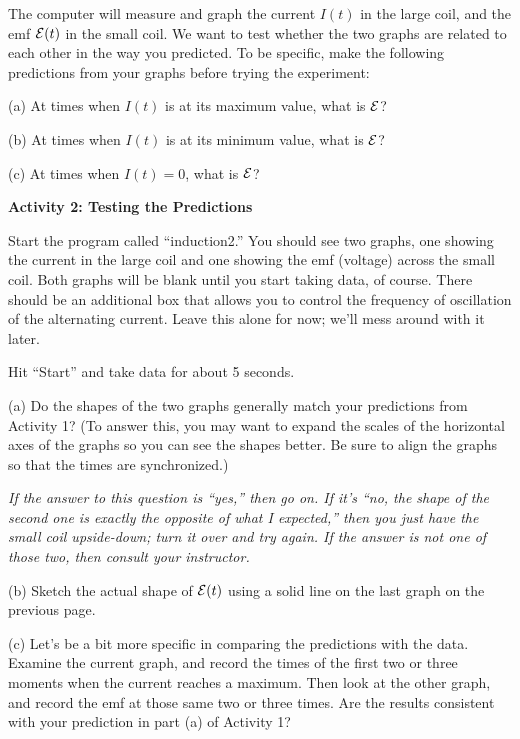 The computer will measure and graph
the current $I(t)$ in the large coil, and the emf ${\cal E}(t)$
in the small coil.  We want to test whether the two graphs are related
to each other in the way you predicted.  To be specific, make the following
predictions from your graphs before trying the experiment:

(a) At times when $I(t)$ is at its maximum value, what is ${\cal E}$?
\answerspace{.8in}

(b) At times when $I(t)$ is at its minimum value, what is ${\cal E}$?
\answerspace{.8in}

(c) At times when $I(t)=0$, what is ${\cal E}$?
\answerspace{.8in}


\pagebreak[2]

{\bf Activity 2: Testing the Predictions}

Start the program called ``induction2.'' You should see two graphs,
one showing the current in the large coil and one showing the emf (voltage)
across the small coil.  Both graphs will be blank until you start taking
data, of course.  There should be an additional box that allows you to control
the frequency of oscillation of the alternating current.  Leave this alone
for now; we'll mess around with it later.

Hit ``Start'' and take data for about 5 seconds.  

(a) Do the shapes of the
two graphs generally match your predictions from Activity 1? (To answer this, you may want to expand the scales of the horizontal axes of the graphs so you can see the shapes better.  Be sure to align the graphs so that the times are synchronized.) 

\answerspace{1in}

\textit{If the answer to this question is ``yes,'' then go on.  If it's ``no,
the shape of the second one is exactly the opposite of what I expected,''
then you just have the small coil upside-down; turn it over and 
try again.  If the answer is not one of those two, then consult your 
instructor.}

(b) Sketch the actual shape of ${\cal E}(t)$ using a solid line on the last graph on the previous page.
\bigskip

(c) Let's be a bit more specific in comparing the predictions
with the data.  Examine the current graph, and record the
times of the first two or three moments when the current reaches a maximum.
Then look at the other graph, and record the emf at those same two or three times.
Are the results consistent with your prediction in part (a) of Activity 1?

